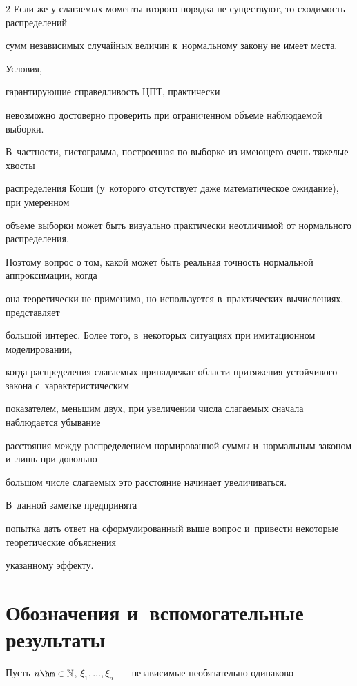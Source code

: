 \begin{multicols}{2}
 Если же у слагаемых моменты второго порядка не существуют, то сходимость распределений 

 сумм независимых случайных величин к~нормальному закону не имеет места. 

 

 Условия, 

 гарантирующие справедливость ЦПТ, практически 

 невозможно достоверно проверить при ограниченном объеме наблюдаемой выборки. 

 В~част\-ности, гистограмма, построенная по выборке из имеющего очень тяжелые хвосты 

 распределения Коши (у~которого отсутствует даже математическое ожидание), при умеренном 

 объеме выборки может быть визуально практически неотличимой от нормального распределения. 

 Поэтому вопрос о том, какой может быть реальная точность нормальной аппроксимации, когда 

 она теоретически не применима, но используется в~практических вычислениях, представляет 

 большой интерес. Более того, в~некоторых ситуациях при имитационном моделировании, 

 когда распределения слагаемых принадлежат области притяжения устойчивого закона с~характеристическим 

 показателем, меньшим двух, при увеличении числа слагаемых сначала наблюдается убывание 

 расстояния между распределением нормированной суммы и~нормальным законом и~лишь при довольно 

 большом числе слагаемых это расстояние начинает увеличиваться. 

 

 В~данной заметке предпринята 

 попытка дать ответ на сформулированный выше вопрос и~привести некоторые теоретические объяснения 

 указанному эффекту.





\section{Обозначения и~вспомогательные результаты}





Пусть $n\hm\in\mathbb{N}$, $\xi_1,\ldots,\xi_n$~--- независимые необязательно одинаково 


\end{multicols}
